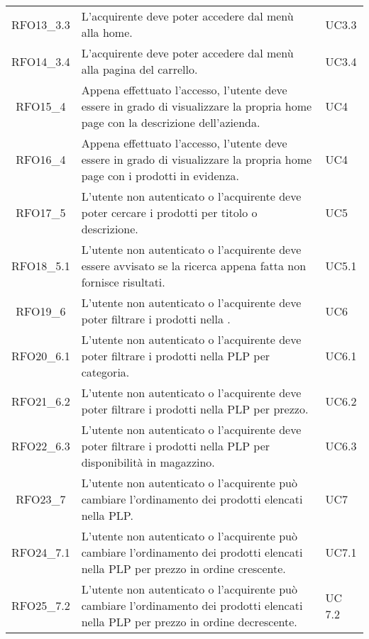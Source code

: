 \begin{longtable}{|c C{9.5cm} C{2.5cm}|}
	RFO13\_3.3 & L'acquirente deve poter accedere dal menù alla home. & UC3.3 \\

	RFO14\_3.4 & L'acquirente deve poter accedere dal menù alla pagina del carrello. & UC3.4 \\

    RFO15\_4 & Appena effettuato l'accesso, l'utente deve essere in grado di visualizzare la propria home page con la descrizione dell'azienda. & UC4 \\
    
    RFO16\_4 & Appena effettuato l'accesso, l'utente deve essere in grado di visualizzare la propria home page con i prodotti in evidenza. & UC4 \\

    RFO17\_5 & L'utente non autenticato o l'acquirente deve poter cercare i prodotti per titolo o descrizione. & UC5 \\
    
    RFO18\_5.1 &  L'utente non autenticato o l'acquirente deve essere avvisato se la ricerca appena fatta non fornisce risultati. & UC5.1 \\
    
    RFO19\_6 & L'utente non autenticato o l'acquirente deve poter filtrare i prodotti nella . & UC6\\
    
    RFO20\_6.1 & L'utente non autenticato o l'acquirente deve poter filtrare i prodotti nella PLP per categoria. & UC6.1 \\
    
    RFO21\_6.2 & L'utente non autenticato o l'acquirente deve poter filtrare i prodotti nella PLP per prezzo. & UC6.2 \\
    
    RFO22\_6.3 & L'utente non autenticato o l'acquirente deve poter filtrare i prodotti nella PLP per disponibilità in magazzino. & UC6.3 \\
    
    RFO23\_7 & L'utente non autenticato o l'acquirente può cambiare l'ordinamento dei prodotti elencati nella PLP. & UC7 \\
    
    RFO24\_7.1 & L'utente non autenticato o l'acquirente può cambiare l'ordinamento dei prodotti elencati nella PLP per prezzo in ordine crescente. & UC7.1 \\
    
    RFO25\_7.2 & L'utente non autenticato o l'acquirente può cambiare l'ordinamento dei prodotti elencati nella PLP per prezzo in ordine decrescente. & UC 7.2 \\
    

\end{longtable}

